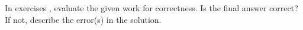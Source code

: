 {\noindent In exercises}
{, evaluate the given work for correctness. Is the final answer correct? If not, describe the error(s) in the solution.}
